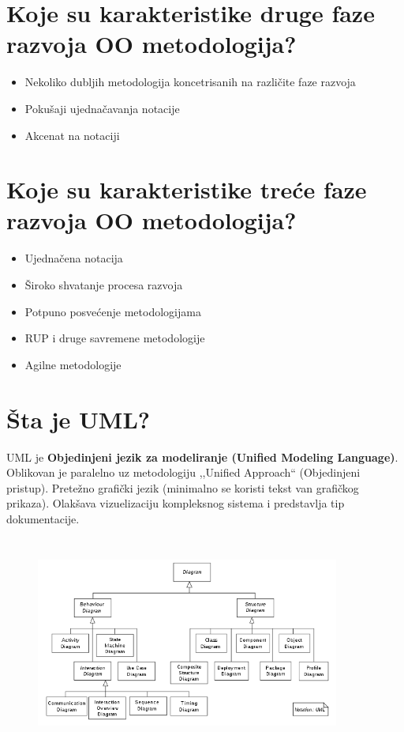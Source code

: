 \documentclass[a4paper]{article}
\begin{document}
\section{Koje su karakteristike druge faze razvoja OO metodologija?}
  \begin{itemize}
    \item Nekoliko dubljih metodologija koncetrisanih na različite faze razvoja
    \item Pokušaji ujednačavanja notacije
    \item Akcenat na notaciji
  \end{itemize}

\section{Koje su karakteristike treće faze razvoja OO metodologija?}
  \begin{itemize}
    \item Ujednačena notacija 
    \item Široko shvatanje procesa razvoja 
    \item Potpuno posvećenje metodologijama 
    \item RUP i druge savremene metodologije 
    \item Agilne metodologije
  \end{itemize}

\section{Šta je UML?}
  UML je \textbf{Objedinjeni jezik za modeliranje (Unified Modeling Language)}. 
  Oblikovan je paralelno uz metodologiju ,,Unified Approach`` (Objedinjeni pristup). Pretežno 
  grafički jezik (minimalno se koristi tekst van grafičkog prikaza). Olakšava vizuelizaciju 
  kompleksnog sistema i predstavlja tip dokumentacije. \cite{vp_uml}
  \begin{figure}[H]
    \begin{center}
        \includegraphics[width=100mm,height=70mm]{Slike/uml.png}
    \end{center}
  \end{figure} 
\end{document}
